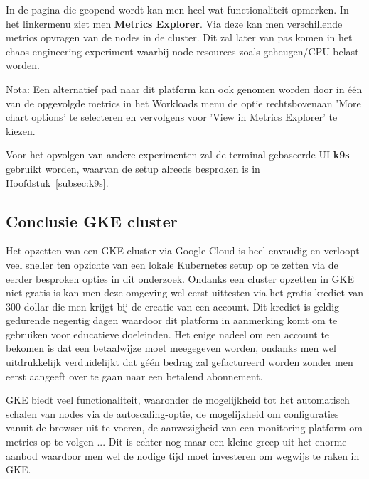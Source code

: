 In de pagina die geopend wordt kan men heel wat functionaliteit opmerken. In het linkermenu ziet men {\bf Metrics Explorer}. Via deze kan men verschillende metrics opvragen van de nodes in de cluster. 
Dit zal later van pas komen in het chaos engineering experiment waarbij node resources zoals geheugen/CPU belast worden. 

Nota: Een alternatief pad naar dit platform kan ook genomen worden door in één van de opgevolgde metrics in het Workloads menu de optie rechtsbovenaan 'More chart options' te selecteren en vervolgens voor 'View in Metrics Explorer' te kiezen. 

Voor het opvolgen van andere experimenten zal de terminal-gebaseerde UI {\bf k9s} gebruikt worden, waarvan de setup alreeds besproken is in Hoofdstuk~\ref{subsec:k9s}. 
  
\subsection{Conclusie GKE cluster}

Het opzetten van een GKE cluster via Google Cloud is heel envoudig en verloopt veel sneller ten opzichte van een lokale Kubernetes setup op te zetten via de eerder besproken opties in dit onderzoek. Ondanks een cluster opzetten in GKE niet gratis is kan men deze omgeving wel eerst uittesten via het gratis krediet van 300 dollar die men krijgt bij de creatie van een account. Dit krediet is geldig gedurende negentig dagen waardoor dit platform in aanmerking komt om te gebruiken voor educatieve doeleinden. Het enige nadeel om een account te bekomen is dat een betaalwijze moet meegegeven worden, ondanks men wel uitdrukkelijk verduidelijkt dat géén bedrag zal gefactureerd worden zonder men eerst aangeeft over te gaan naar een betalend abonnement. 

GKE biedt veel functionaliteit, waaronder de mogelijkheid tot het automatisch schalen van nodes via de autoscaling-optie, de mogelijkheid om configuraties vanuit de browser uit te voeren, de aanwezigheid van een monitoring platform om metrics op te volgen ... Dit is echter nog maar een kleine greep uit het enorme aanbod waardoor men wel de nodige tijd moet investeren om wegwijs te raken in GKE.  